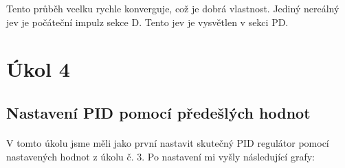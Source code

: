 \documentclass{article}
\begin{document}
	   		Tento průběh vcelku rychle konverguje, což je dobrá vlastnost. Jediný nereálný jev je počáteční impulz sekce D. Tento jev je vysvětlen v sekci PD.
	   		
	   		
\begin{table}[H]
\centering

\caption{Hodnoty konstant pro idealní PID}
\label{tab:pid_ideal}
\end{table}


\section{Úkol 4}
\subsection{Nastavení PID pomocí předešlých hodnot}
\paragraph{}
V tomto úkolu jsme měli jako první nastavit skutečný PID regulátor pomocí nastavených hodnot z úkolu č. 3. Po nastavení mi vyšly následující grafy:
\end{document}
